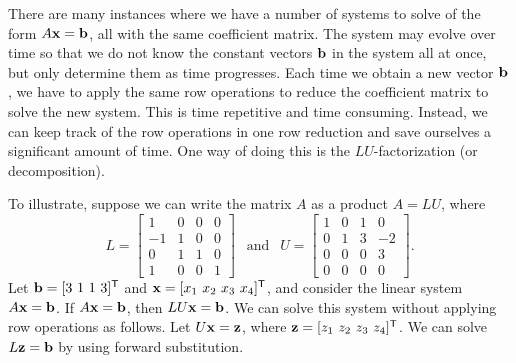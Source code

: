 
There are many instances where we have a number of systems to solve of the form $A \mathbf{x} = \mathbf{b}$, all with the same coefficient matrix. The system may evolve over time so that we do not know the constant vectors $\mathbf{b}$ in the system all at once, but only determine them as time progresses. Each time we obtain a new vector $\mathbf{b}$, we have to apply the same row operations to reduce the coefficient matrix to solve the new system. This is time repetitive and time consuming. Instead, we can keep track of the row operations in one row reduction and save ourselves a significant amount of time. One way of doing this is the $LU$-factorization (or decomposition). 

To illustrate, suppose we can write the matrix $A$ as a product $A = LU$,
where 
\[L = \left[ \begin{array}{rccc} 1&0&0&0\\-1&1&0&0 \\0&1&1&0\\1&0&0&1\end{array}  \right] \ \ \text{ and } \ \ U = \left[ \begin{array}{ccrr} 1&0&1&0\\0&1&3&-2 \\0&0&0&3\\0&0&0&0\end{array}  \right].\]
Let $\mathbf{b} = [3 \ 1 \ 1 \ 3]^{\mathsf{T}}$ and $\mathbf{x} = [x_1 \ x_2 \ x_3 \ x_4]^{\mathsf{T}}$, and consider the linear system $A \mathbf{x} = \mathbf{b}$. If $A \mathbf{x} = \mathbf{b}$, then $LU \mathbf{x} = \mathbf{b}$. We can solve this system without applying row operations as follows. Let $U\mathbf{x} = \mathbf{z}$, where $\mathbf{z} = [z_1 \ z_2 \ z_3 \ z_4]^{\mathsf{T}}$. We can solve $L\mathbf{z} = \mathbf{b}$ by using forward substitution.

